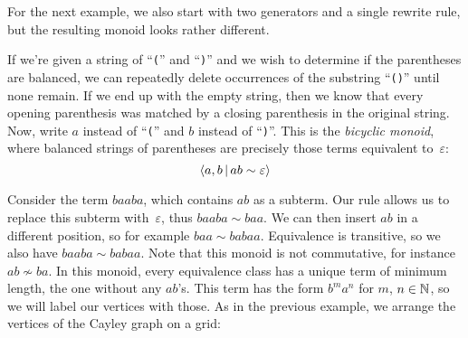 \documentclass[../generics]{subfiles}
\begin{document}
\begin{example}\label{bicyclic}
For the next example, we also start with two generators and a single rewrite rule, but the resulting monoid looks rather different.

If we're given a string of ``\texttt{(}'' and ``\texttt{)}'' and we wish to determine if the parentheses are balanced, we can repeatedly delete occurrences of the substring ``\texttt{()}'' until none remain. If we end up with the empty string, then we know that every opening parenthesis was matched by a closing parenthesis in the original string. Now, write $a$ instead of ``\texttt{(}'' and $b$ instead of ``\texttt{)}''. This is the \emph{bicyclic monoid}, where balanced strings of parentheses are precisely those terms equivalent to~$\varepsilon$:
\[\langle a, b\,|\,ab\sim\varepsilon\rangle\]

Consider the term $baaba$, which contains $ab$ as a subterm. Our rule allows us to replace this subterm with~$\varepsilon$, thus $baaba\sim baa$. We can then insert $ab$ in a different position, so for example $baa\sim babaa$. Equivalence is transitive, so we also have $baaba\sim babaa$. Note that this monoid is not commutative, for instance $ab\not\sim ba$. In this monoid, every equivalence class has a unique term of minimum length, the one without any $ab$'s. This term has the form $b^ma^n$ for $m$, $n\in\mathbb{N}$, so we will label our vertices with those. As in the previous example, we arrange the vertices of the Cayley graph on a grid:

\begin{center}
\end{center}
\end{example}
\end{document}
